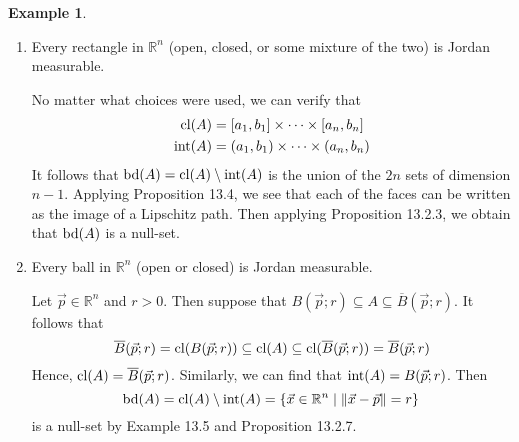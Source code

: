 \documentclass[11pt]{article}
\theoremstyle{definition}
\newtheorem{exmp}[thm]{Example}
\newcommand{\R}{\ensuremath{\mathbb{R}}}
\begin{document}
\begin{exmp}~\vspace{-1.5ex}
\begin{enumerate}[(1)]
\item Every rectangle in $\R^n$ (open, closed, or some mixture of the two) is Jordan measurable.

No matter what choices were used, we can verify that
\begin{align*}
    {\rm cl}(A) &= [a_1, b_1] \times \cdots \times [a_n, b_n] \\
    {\rm int}(A) &= (a_1, b_1) \times \cdots \times (a_n, b_n)
\end{align*}
It follows that ${\rm bd}(A) = {\rm cl}(A) \setminus {\rm int}(A)$ is the union of the $2n$ sets of dimension $n-1$. Applying Proposition 13.4, we see that each of the faces can be written as the image of a Lipschitz path. Then applying Proposition 13.2.3, we obtain that ${\rm bd}(A)$ is a null-set.
\item Every ball in $\R^n$ (open or closed) is Jordan measurable.

Let $\vec{p} \in \R^n$ and $r > 0$. Then suppose that $B(\vec{p}; r) \subseteq A \subseteq \overline{B}(\vec{p}; r)$. It follows that
$$\overline{B}(\vec{p}; r) = {\rm cl}(B(\vec{p}; r)) \subseteq {\rm cl}(A) \subseteq {\rm cl}(\overline{B}(\vec{p}; r)) = \overline{B}(\vec{p}; r)$$
Hence, ${\rm cl}(A) = \overline{B}(\vec{p}; r)$. Similarly, we can find that ${\rm int}(A) = B(\vec{p}; r)$. Then
$${\rm bd}(A) = {\rm cl}(A) \setminus {\rm int}(A) = \{\vec{x} \in \R^n \mid \|\vec{x} - \vec{p}\| = r\}$$
is a null-set by Example 13.5 and Proposition 13.2.7.
\end{enumerate}
\end{exmp}
\end{document}
